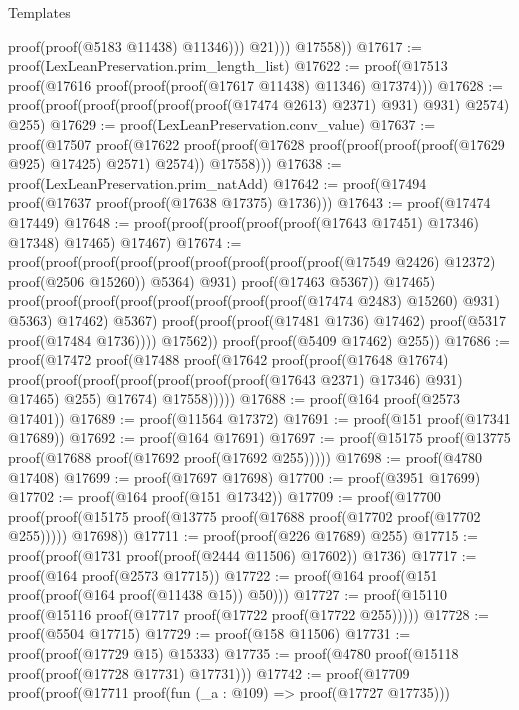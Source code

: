 \begin{lexlean}{Templates}
\begin{coremodule}
                          proof(proof(@5183 @11438) @11346)))
                    @21)))
          @17558))
@17617 := proof(LexLeanPreservation.prim_length_list)
@17622 := proof(@17513 proof(@17616 proof(proof(proof(@17617 @11438) @11346) @17374)))
@17628 := proof(proof(proof(proof(proof(proof(@17474 @2613) @2371) @931) @931) @2574) @255)
@17629 := proof(LexLeanPreservation.conv_value)
@17637 := proof(@17507
      proof(@17622
          proof(proof(@17628 proof(proof(proof(proof(@17629 @925) @17425) @2571) @2574)) @17558)))
@17638 := proof(LexLeanPreservation.prim_natAdd)
@17642 := proof(@17494 proof(@17637 proof(proof(@17638 @17375) @1736)))
@17643 := proof(@17474 @17449)
@17648 := proof(proof(proof(proof(proof(@17643 @17451) @17346) @17348) @17465) @17467)
@17674 := proof(proof(proof(proof(proof(proof(proof(proof(proof(@17549 @2426) @12372)
                  proof(@2506 @15260))
                @5364)
              @931)
            proof(@17463 @5367))
          @17465)
        proof(proof(proof(proof(proof(proof(proof(proof(@17474 @2483) @15260) @931) @5363) @17462)
                @5367)
              proof(proof(proof(@17481 @1736) @17462) proof(@5317 proof(@17484 @1736))))
            @17562))
      proof(proof(@5409 @17462) @255))
@17686 := proof(@17472
      proof(@17488
          proof(@17642
              proof(proof(@17648 @17674)
                  proof(proof(proof(proof(proof(proof(proof(@17643 @2371) @17346) @931) @17465)
                          @255)
                        @17674)
                      @17558)))))
@17688 := proof(@164 proof(@2573 @17401))
@17689 := proof(@11564 @17372)
@17691 := proof(@151 proof(@17341 @17689))
@17692 := proof(@164 @17691)
@17697 := proof(@15175 proof(@13775 proof(@17688 proof(@17692 proof(@17692 @255)))))
@17698 := proof(@4780 @17408)
@17699 := proof(@17697 @17698)
@17700 := proof(@3951 @17699)
@17702 := proof(@164 proof(@151 @17342))
@17709 := proof(@17700
      proof(proof(@15175 proof(@13775 proof(@17688 proof(@17702 proof(@17702 @255))))) @17698))
@17711 := proof(proof(@226 @17689) @255)
@17715 := proof(proof(@1731 proof(proof(@2444 @11506) @17602)) @1736)
@17717 := proof(@164 proof(@2573 @17715))
@17722 := proof(@164 proof(@151 proof(proof(@164 proof(@11438 @15)) @50)))
@17727 := proof(@15110 proof(@15116 proof(@17717 proof(@17722 proof(@17722 @255)))))
@17728 := proof(@5504 @17715)
@17729 := proof(@158 @11506)
@17731 := proof(proof(@17729 @15) @15333)
@17735 := proof(@4780 proof(@15118 proof(proof(@17728 @17731) @17731)))
@17742 := proof(@17709
      proof(proof(@17711 proof(fun (_a : @109) => proof(@17727 @17735)))

\end{coremodule}
\end{lexlean}
